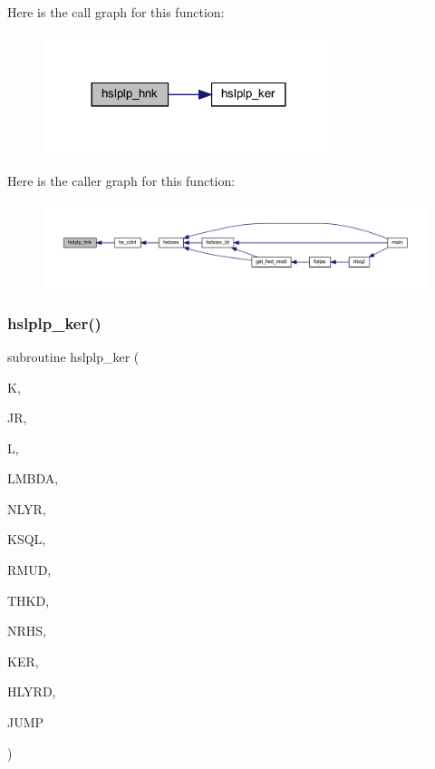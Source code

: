 Here is the call graph for this function\+:\nopagebreak
\begin{figure}[H]
\begin{center}
\leavevmode
\includegraphics[width=240pt]{Leroi_8f90_a9418379c5cb3a81d71a2a66746f839da_cgraph}
\end{center}
\end{figure}
Here is the caller graph for this function\+:\nopagebreak
\begin{figure}[H]
\begin{center}
\leavevmode
\includegraphics[width=350pt]{Leroi_8f90_a9418379c5cb3a81d71a2a66746f839da_icgraph}
\end{center}
\end{figure}
\mbox{\label{Leroi_8f90_a6a948de64e256424bee5e99021fa129c}} 
\subsubsection{\texorpdfstring{hslplp\+\_\+ker()}{hslplp\_ker()}}
{\footnotesize\ttfamily subroutine hslplp\+\_\+ker (\begin{DoxyParamCaption}\item[{integer}]{K,  }\item[{integer}]{JR,  }\item[{integer}]{L,  }\item[{real(kind=ql)}]{L\+M\+B\+DA,  }\item[{integer}]{N\+L\+YR,  }\item[{complex(kind=ql), dimension (nlyr)}]{K\+S\+QL,  }\item[{real(kind=ql), dimension(0\+:nlyr)}]{R\+M\+UD,  }\item[{real(kind=ql), dimension(nlyr)}]{T\+H\+KD,  }\item[{integer}]{N\+R\+HS,  }\item[{complex(kind=ql), dimension(jnlo-\/nrhs\+:jnhi)}]{K\+ER,  }\item[{complex(kind=ql), dimension(nrhs)}]{H\+L\+Y\+RD,  }\item[{logical}]{J\+U\+MP }\end{DoxyParamCaption})}

